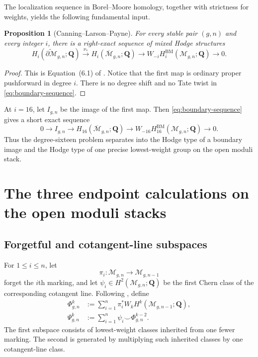 \documentclass[12pt,reqno]{amsart}
\newcommand{\Q}{\mathbf{Q}}
\newcommand{\M}{\mathcal{M}}
\newcommand{\Mbar}{\overline{\mathcal{M}}}
\newcommand{\BM}{\mathrm{BM}}
\newtheorem{proposition}[theorem]{Proposition}
\theoremstyle{definition}
\theoremstyle{remark}
\begin{document}
The localization sequence in Borel--Moore homology, together with strictness
for weights, yields the following fundamental input.

\begin{proposition}[Canning--Larson--Payne]\label{prop:boundary-sequence}
For every stable pair $(g,n)$ and every integer $i$, there is a right-exact
sequence of mixed Hodge structures
\begin{equation}\label{eq:boundary-sequence}
 H_i(\widetilde{\partial\M}_{g,n};\Q)
 \xrightarrow{\nu_*}
 H_i(\Mbar_{g,n};\Q)
 \longrightarrow
 W_{-i}H_i^{\BM}(\M_{g,n};\Q)
 \longrightarrow0.
\end{equation}
\end{proposition}

\begin{proof}
This is Equation~(6.1) of \cite{CLP}.  Notice that the first map is ordinary
proper pushforward in degree $i$.  There is no degree shift and no Tate twist
in \eqref{eq:boundary-sequence}.
\end{proof}

At $i=16$, let $I_{g,n}$ be the image of the first map.  Then
\eqref{eq:boundary-sequence} gives a short exact sequence
\begin{equation}\label{eq:boundary-short}
 0\longrightarrow I_{g,n}
 \longrightarrow H_{16}(\Mbar_{g,n};\Q)
 \longrightarrow W_{-16}H_{16}^{\BM}(\M_{g,n};\Q)
 \longrightarrow0.
\end{equation}
Thus the degree-sixteen problem separates into the Hodge type of a boundary
image and the Hodge type of one precise lowest-weight group on the open
moduli stack.

\section{The three endpoint calculations on the open moduli stacks}

\subsection{Forgetful and cotangent-line subspaces}

For $1\leq i\leq n$, let
\[
  \pi_i\colon\M_{g,n}\longrightarrow\M_{g,n-1}
\]
forget the $i$th marking, and let $\psi_i\in H^2(\M_{g,n};\Q)$ be the first
Chern class of the corresponding cotangent line.  Following
\cite[Sections~2 and 3]{CLP}, define
\begin{align}
 \Phi^k_{g,n}
   &:=\sum_{i=1}^n
       \pi_i^*W_kH^k(\M_{g,n-1};\Q),\label{eq:Phi-new}\\
 \Psi^k_{g,n}
   &:=\sum_{i=1}^n
       \psi_i\smile\Phi^{k-2}_{g,n}.
       \label{eq:Psi-new}
\end{align}
The first subspace consists of lowest-weight classes inherited from one
fewer marking.  The second is generated by multiplying such inherited
classes by one cotangent-line class.
\end{document}
